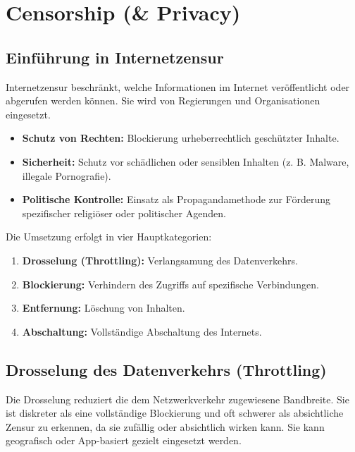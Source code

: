\documentclass[
../../css_summary.tex,
]{subfiles}
\begin{document}
\section{Censorship (\& Privacy)}

\subsection{Einführung in Internetzensur}

Internetzensur beschränkt, welche Informationen im Internet veröffentlicht oder abgerufen werden können. Sie wird von Regierungen und Organisationen eingesetzt.

\begin{defbox}
  \begin{itemize}
    \item \textbf{Schutz von Rechten:} Blockierung urheberrechtlich geschützter Inhalte.
    \item \textbf{Sicherheit:} Schutz vor schädlichen oder sensiblen Inhalten (z. B. Malware, illegale Pornografie).
    \item \textbf{Politische Kontrolle:} Einsatz als Propagandamethode zur Förderung spezifischer religiöser oder politischer Agenden.
  \end{itemize}
\end{defbox}

Die Umsetzung erfolgt in vier Hauptkategorien:
\begin{enumerate}
  \item \textbf{Drosselung (Throttling):} Verlangsamung des Datenverkehrs.
  \item \textbf{Blockierung:} Verhindern des Zugriffs auf spezifische Verbindungen.
  \item \textbf{Entfernung:} Löschung von Inhalten.
  \item \textbf{Abschaltung:} Vollständige Abschaltung des Internets.
\end{enumerate}

\subsection{Drosselung des Datenverkehrs (Throttling)}

Die Drosselung reduziert die dem Netzwerkverkehr zugewiesene Bandbreite. Sie ist diskreter als eine vollständige Blockierung und oft schwerer als absichtliche Zensur zu erkennen, da sie zufällig oder absichtlich wirken kann. Sie kann geografisch oder App-basiert gezielt eingesetzt werden.
\end{document}
